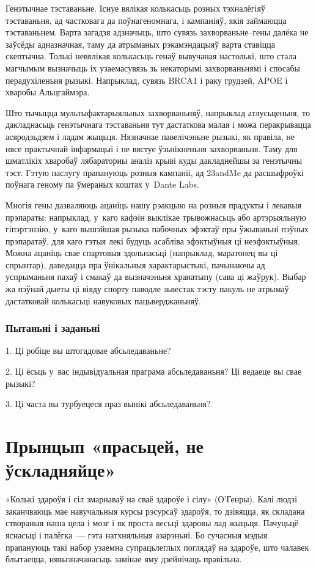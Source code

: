 Генэтычнае тэставаньне. Існуе вялікая колькасьць розных тэхналёгіяў тэставаньня, ад частковага да поўнагеномнага, і кампаніяў, якія займаюцца тэставаньнем. Варта загадзя адзначыць, што сувязь захворваньне--гены далёка не заўсёды адназначная, таму да атрыманых рэкамэндацыяў варта ставіцца скептычна. Толькі невялікая колькасьць генаў вывучаная настолькі, што стала магчымым вызначыць іх узаемасувязь зь некаторымі захворваньнямі і спосабы перадухіленьня рызыкі. Напрыклад, сувязь BRCA1 і раку грудзей, APOE і хваробы Альцгаймэра.

Што тычыцца мультыфактарыяльных захворваньняў, напрыклад атлусьценьня, то дакладнасьць генэтычнага тэставаньня тут дастаткова малая і можа перакрывацца асяродзьдзем і ладам жыцьця. Нязначнае павелічэньне рызыкі, як правіла, не нясе практычнай інфармацыі і не вястуе ўзьнікненьня захворваньня. Таму для шматлікіх хваробаў лябараторны аналіз крыві куды дакладнейшы за генэтычны тэст. Гэтую паслугу прапануюць розныя кампаніі, ад 23andMe да расшыфроўкі поўнага геному па ўмераных коштах у~Dante Labs.

Многія гены дазваляюць ацаніць нашу рэакцыю на розныя прадукты і лекавыя прэпараты: напрыклад, у~каго кафэін выклікае трывожнасьць або артэрыяльную гіпэртэнзію, у~каго вышэйшая рызыка пабочных эфэктаў пры ўжываньні пэўных прэпаратаў, для каго гэтыя лекі будуць асабліва эфэктыўныя ці неэфэктыўныя. Можна ацаніць свае спартовыя здольнасьці (напрыклад, маратонец вы ці спрынтар), даведацца пра ўнікальныя характарыстыкі, пачынаючы ад успрыманьня пахаў і смакаў да вызначэньня хранатыпу (сава ці жаўрук). Выбар жа пэўнай дыеты ці віяду спорту паводле зьвестак тэсту пакуль не атрымаў дастатковай колькасьці навуковых пацьверджаньняў.

\subsubsection{Пытаньні і заданьні}

1. Ці робіце вы штогадовае абсьледаваньне?

2. Ці ёсьць у~вас індывідуальная праграма абсьледаваньня? Ці ведаеце вы свае рызыкі?

3. Ці часта вы турбуецеся праз вынікі абсьледаваньня?


\section{Прынцып «прасьцей, не ўскладняйце»}

«Колькі здароўя і сіл змарнаваў на сваё здароўе і сілу» (О'Генры). Калі людзі заканчваюць мае навучальныя курсы рэсурсаў здароўя, то дзівяцца, як складана створаныя наша цела і мозг і як проста весьці здаровы лад жыцьця. Пачуцьцё яснасьці і палёгка~--- гэта натхняльныя азарэньні. Бо сучасныя мэдыя прапануюць такі набор узаемна супрацьлеглых поглядаў на здароўе, што чалавек блытаецца, нявызначанасьць замінае яму дзейнічаць правільна.

